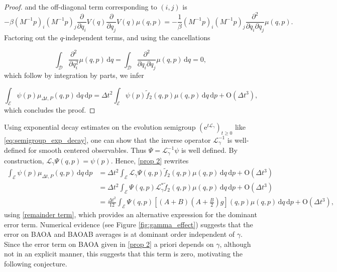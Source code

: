 \begin{proof}
and the off-diagonal term corresponding to $(i,j)$ is 
\begin{equation}
 \label{off diagonal term} -\beta \left(M^{-1}p\right)_i\left(M^{-1}p\right)_j\frac{\partial}{\partial q_i}V(q)\frac{\partial}{\partial q_j}V(q)\mu(q,p)=-\frac1{\beta}\left(M^{-1}p\right)_i\left(M^{-1}p\right)_j\frac{\partial^2}{\partial q_i\partial q_j}\mu(q,p).
\end{equation}
Factoring out the $q$-independent terms, and using the cancellations

\begin{equation}
  \label{second order cancellations on mu}
  \int_{\mathcal D}\frac{\partial^2}{\partial q_i^2}\mu(q,p)\,\mathrm{d}q=\int_{\mathcal D}\frac{\partial^2}{\partial q_i\partial q_j}\mu(q,p)\,\mathrm{d}q=0,
\end{equation}
which follow by integration by parts, we infer

\begin{equation}
  \int_{\mathcal E} \psi(p) \mu_{\Delta t,P}(q,p)\,\mathrm{d}q\,\mathrm{d}p=\Delta t^2\int_{\mathcal E} \psi(p)\tilde f_2(q,p)\mu(q,p)\,\mathrm{d}q\,\mathrm{d}p + \mathrm{O}(\Delta t^3),
\end{equation}
which concludes the proof.
\end{proof}

\begin{remark}
Using exponential decay estimates on the evolution semigroup $(\mathrm{e}^{t\mathcal L_\gamma})_{t\geq 0}$ like \eqref{eq:semigroup_exp_decay}, one can show that the inverse operator $\mathcal L_\gamma^{-1}$ is well-defined for smooth centered observables.
Thus $\Psi=\mathcal L_\gamma^{-1} \psi$ is well defined. By construction, $\mathcal L_\gamma \Psi(q,p)=\psi(p)$.
Hence, \eqref{prop 2} rewrites 
\begin{align*}
  \int_{\mathcal E} \psi(p) \mu_{\Delta t,P}(q,p)\,\mathrm{d}q\,\mathrm{d}p&=\Delta t^2\int_\mathcal{E}\mathcal L_\gamma \Psi(q,p)\tilde f_2(q,p)\mu(q,p)\,\mathrm{d}q\,\mathrm{d}p+\mathrm{O}(\Delta t^3)\\
  &=\Delta t^2\int_\mathcal{E}\Psi(q,p)\mathcal L_\gamma^*\tilde f_2(q,p)\mu(q,p)\,\mathrm{d}q\,\mathrm{d}p+\mathrm{O}(\Delta t^3)\\
  &=\frac{\Delta t^2}{12}\int_\mathcal{E}\Psi(q,p)\left[\left(A+B\right)\left(A+\frac B2\right)g\right](q,p)\mu(q,p)\,\mathrm{d}q\,\mathrm{d}p+\mathrm{O}(\Delta t^3),
\end{align*}
using \eqref{remainder term}, which provides an alternative expression for the dominant error term.
Numerical evidence (see Figure \ref{fig:gamma_effect}) suggests that the error on BAOA and BAOAB averages is at dominant order independent of $\gamma$. Since the error term on BAOA given in \eqref{prop 2} a priori depends on $\gamma$, although not in an explicit manner, this suggests that this term is zero, motivating the following conjecture.
\end{remark}

